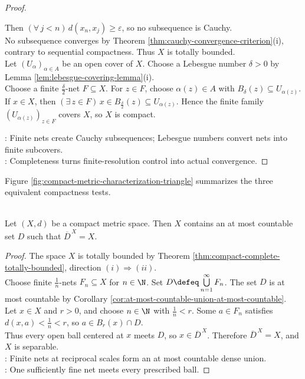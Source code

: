 \begin{theorem}
\begin{proof}
\begin{enumerate}[label=(\roman*)]
Then $(\forall\,j<n)\,d(x_n,x_j)\geq\varepsilon$, so no subsequence is Cauchy.\\
No subsequence converges by Theorem \ref{thm:cauchy-convergence-criterion}(i), contrary to sequential compactness. Thus $X$ is totally bounded.\\
Let $(U_\alpha)_{\alpha\in A}$ be an open cover of $X$. Choose a Lebesgue number $\delta>0$ by Lemma \ref{lem:lebesgue-covering-lemma}(i).\\
Choose a finite $\frac{\delta}{2}$-net $F\subseteq X$. For $z\in F$, choose $\alpha(z)\in A$ with $B_\delta(z)\subseteq U_{\alpha(z)}$.\\
If $x\in X$, then $(\exists\,z\in F)\,x\in B_{\frac{\delta}{2}}(z)\subseteq U_{\alpha(z)}$. Hence the finite family $(U_{\alpha(z)})_{z\in F}$ covers $X$, so $X$ is compact.
\end{enumerate}
: Finite nets create Cauchy subsequences; Lebesgue numbers convert nets into finite subcovers.\\
: Completeness turns finite-resolution control into actual convergence.
\end{proof}
\end{theorem}

Figure \ref{fig:compact-metric-characterization-triangle} summarizes the three equivalent compactness tests.
\begin{illustrationfigure}[H]
  \centering
  
  \caption{The proof cycle connects finite subcovers, completeness with finite $\varepsilon$-nets, and convergent subsequences.}
  \label{fig:compact-metric-characterization-triangle}
\end{illustrationfigure}

\begin{proposition} \label{prop:compact-metric-spaces-separable} \\
Let $(X,d)$ be a compact metric space. Then $X$ contains an at most countable set $D$ such that $\overline{D}^{\,X}=X$.
\begin{proof}
The space $X$ is totally bounded by Theorem \ref{thm:compact-complete-totally-bounded}, direction $(i)\Rightarrow(ii)$.\\
Choose finite $\frac{1}{n}$-nets $F_n\subseteq X$ for $n\in\N$. Set $D\defeq\bigcup\limits_{n=1}^{\infty}F_n$. The set $D$ is at most countable by Corollary \ref{cor:at-most-countable-union-at-most-countable}.\\
Let $x\in X$ and $r>0$, and choose $n\in\N$ with $\frac{1}{n}<r$. Some $a\in F_n$ satisfies $d(x,a)<\frac{1}{n}<r$, so $a\in B_r(x)\cap D$.\\
Thus every open ball centered at $x$ meets $D$, so $x\in\overline{D}^{\,X}$. Therefore $\overline{D}^{\,X}=X$, and $X$ is separable.\\
: Finite nets at reciprocal scales form an at most countable dense union.\\
: One sufficiently fine net meets every prescribed ball.
\end{proof}
\end{proposition}
